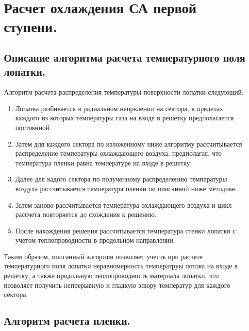 \documentclass[a4paper,10pt]{article}
\begin{document}
\section{Расчет охлаждения СА первой ступени.}

    

    \subsection{Описание алгоритма расчета температурного поля лопатки.}
    
    Алгоритм расчета распределения температуры поверхности лопатки следующий:
    \begin{enumerate}
        \item Лопатка разбивается в радиальном напрвлении на сектора, в пределах каждого из которых
        температуры газа на входе в решетку предполагается постоянной.
        \item Затем для каждого сектора по изложенному ниже алгоритму рассчитывается распределение температуры
        охлаждающего воздуха, предполагая, что температура пленки равна температуре на входе в решетку.
        \item Далее для кадого сектора по полученному распределению температуры воздуха рассчитывается
        температура пленки по описанной ниже методике.
        \item Затем заново рассчитывается температура охлаждающего воздуха и цикл рассчета повторяется до схождения к решению.
        \item После нахождения решения рассчитывается температура стенки лопатки с учетом теплопроводности в продольном направлении.
    \end{enumerate}
    Таким образом, описанный алгоритм позволяет учесть при расчете температурного поля лопатки неравномерность
    температруы  потока на входе в решетку, а также продольную теплопроводность материала лопатки, что позволяет
    получить непрерывную и гладкую эпюру температур для каждого сектора.
%    

    \subsection{Алгоритм расчета пленки.}

    
\end{document}
